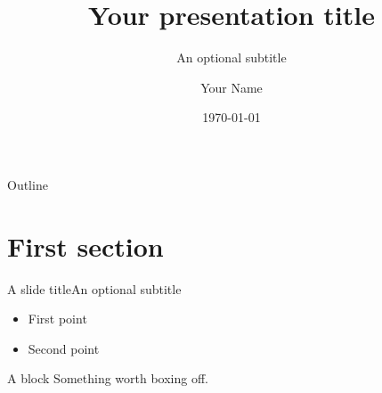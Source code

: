 \documentclass[aspectratio=169,11pt]{beamer}
\title[Short title]{Your presentation title}
\subtitle{An optional subtitle}
\author{Your Name}
\date{\today}
\begin{document}
\begin{frame}
  \titlepage
\end{frame}

\begin{frame}{Outline}
  \tableofcontents
\end{frame}

\section{First section}

\begin{frame}{A slide title}{An optional subtitle}
  \begin{itemize}
    \item First point
    \item Second point
  \end{itemize}

  \begin{block}{A block}
    Something worth boxing off.
  \end{block}
\end{frame}

\begin{frame}
  \sausthankyou
\end{frame}
\end{document}
